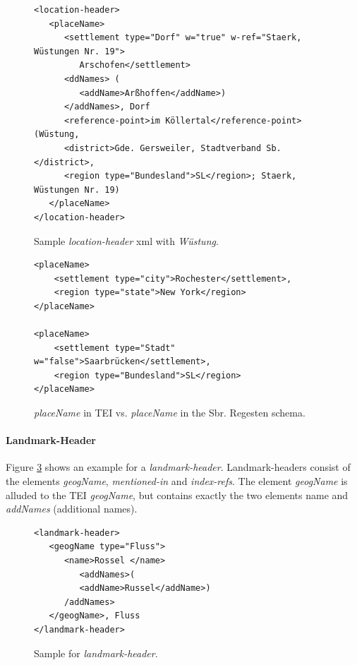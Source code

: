 \begin{figure}[H]
\begin{verbatim}
<location-header>
   <placeName>
      <settlement type="Dorf" w="true" w-ref="Staerk, Wüstungen Nr. 19">
         Arschofen</settlement>
      <ddNames> (
         <addName>Arßhoffen</addName>)
      </addNames>, Dorf 
      <reference-point>im Köllertal</reference-point> (Wüstung, 
      <district>Gde. Gersweiler, Stadtverband Sb.</district>, 
      <region type="Bundesland">SL</region>; Staerk, Wüstungen Nr. 19) 
   </placeName>
</location-header>
\end{verbatim}
\label{fig:location-wuest-xml}
\caption{Sample \textit{location-header} xml with \textit{Wüstung}.}
\end{figure}

\begin{figure}[H]
\begin{verbatim}
<placeName>
    <settlement type="city">Rochester</settlement>,
    <region type="state">New York</region>
</placeName>

<placeName>
    <settlement type="Stadt" w="false">Saarbrücken</settlement>,
    <region type="Bundesland">SL</region>
</placeName>
\end{verbatim}
\label{fig:placeName}
\caption{\textit{placeName} in TEI vs. \textit{placeName} in the Sbr. Regesten schema.}
\end{figure}


\paragraph{Landmark-Header}
Figure \ref{fig:landmark-header-xml} shows an example for a \textit{landmark-header}. Landmark-headers consist of the elements \textit{geogName}, \textit{mentioned-in} and \textit{index-refs}. The element \textit{geogName} is alluded to the TEI \textit{geogName}, but contains exactly the two elements name and \textit{addNames} (additional names).

\begin{figure}[H]
\begin{verbatim}
<landmark-header>
   <geogName type="Fluss">
      <name>Rossel </name>
         <addNames>(
         <addName>Russel</addName>)
      /addNames>
   </geogName>, Fluss 
</landmark-header>
\end{verbatim}
\label{fig:landmark-header-xml}
\caption{Sample for \textit{landmark-header}.}
\end{figure}

